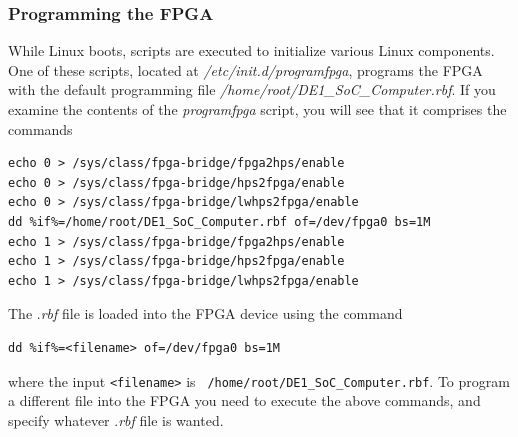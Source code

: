 \documentclass[11pt, twoside, pdftex]{article}
\begin{document}
\subsubsection*{Programming the FPGA}
\label{sec:program_fpga}

While Linux boots, scripts are executed to initialize various Linux components. One of these 
scripts, located at {\it /etc/init.d/programfpga}, programs the FPGA with the default 
programming file {\it /home/root/DE1\_SoC\_Computer.rbf}. If you examine the contents of
the {\it programfpga} script, you will see that it comprises the commands 

\lstset{language=sh,numbers=none,escapechar=\%}
\begin{center}
\begin{minipage}[t]{16 cm}
\begin{lstlisting}
echo 0 > /sys/class/fpga-bridge/fpga2hps/enable
echo 0 > /sys/class/fpga-bridge/hps2fpga/enable
echo 0 > /sys/class/fpga-bridge/lwhps2fpga/enable
dd %if%=/home/root/DE1_SoC_Computer.rbf of=/dev/fpga0 bs=1M
echo 1 > /sys/class/fpga-bridge/fpga2hps/enable
echo 1 > /sys/class/fpga-bridge/hps2fpga/enable
echo 1 > /sys/class/fpga-bridge/lwhps2fpga/enable
\end{lstlisting}
\end{minipage}
\end{center}

The .{\it rbf} file is loaded into the FPGA device using the command
\lstset{language=sh,numbers=none,escapechar=\%}
\begin{lstlisting}
dd %if%=<filename> of=/dev/fpga0 bs=1M
\end{lstlisting}
where the input \texttt{<filename>} is \texttt{ /home/root/DE1\_SoC\_Computer.rbf}. To program 
a different file into the FPGA you need to execute the above commands, and specify 
whatever .{\it rbf} file is wanted. 
\end{document}
